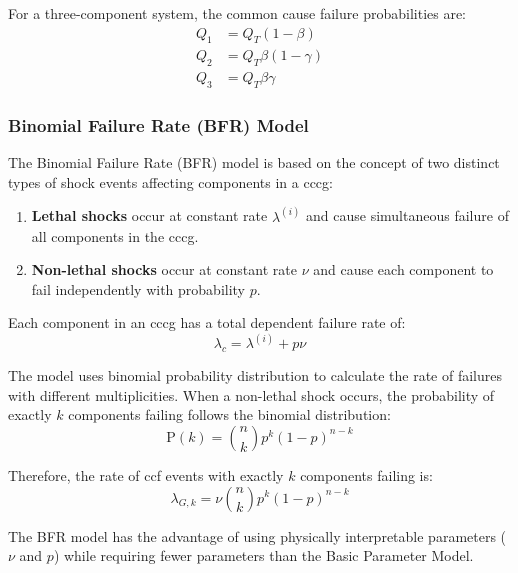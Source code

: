 For a three-component system, the common cause failure probabilities are:
\[
\begin{aligned}
Q_1 &= Q_T(1-\beta) \\
Q_2 &= Q_T\beta(1-\gamma) \\
Q_3 &= Q_T\beta\gamma
\end{aligned}
\]

\subsubsection{Binomial Failure Rate (BFR) Model}

The Binomial Failure Rate (BFR) model is based on the concept of two distinct types of shock events affecting components in a \acrshort{cccg}:

\begin{enumerate}
  \item \textbf{Lethal shocks} occur at constant rate $\lambda^{(i)}$ and cause simultaneous failure of all components in the \acrshort{cccg}.
  
  \item \textbf{Non-lethal shocks} occur at constant rate $\nu$ and cause each component to fail independently with probability $p$.
\end{enumerate}

Each component in an \acrshort{cccg} has a total dependent failure rate of:
\begin{equation}
\lambda_c = \lambda^{(i)} + p\nu
\end{equation}

The model uses binomial probability distribution to calculate the rate of failures with different multiplicities. When a non-lethal shock occurs, the probability of exactly $k$ components failing follows the binomial distribution:
\begin{equation}
\text{P}(k) = \binom{n}{k}p^k(1-p)^{n-k}
\end{equation}

Therefore, the rate of \acrshort{ccf} events with exactly $k$ components failing is:
\begin{equation}
\lambda_{G,k} = \nu\binom{n}{k}p^k(1-p)^{n-k}
\end{equation}

The BFR model has the advantage of using physically interpretable parameters ($\nu$ and $p$) while requiring fewer parameters than the Basic Parameter Model.

